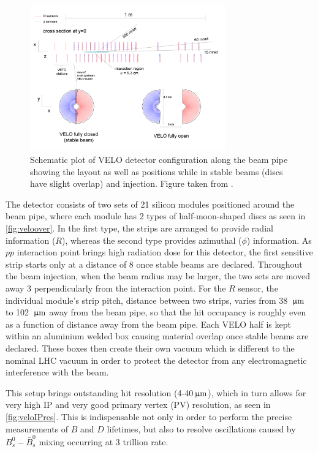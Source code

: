 \begin{figure}[!h]
	\centering
	\includegraphics[width = 0.75\textwidth]{figs/detector/veloOverview.png}
	\caption{ Schematic plot of \Gls{VELO} detector configuration along the beam pipe showing the layout as well as positions while in stable beams (discs have slight overlap) and injection. Figure taken from \cite{det_paper}.}
	\label{fig:veloover}
\end{figure}

The detector consists of two sets of 21 silicon modules positioned around the beam pipe, where each module has 2 types of half-moon-shaped discs as seen in \autoref{fig:veloover}. In the first type, the strips are arranged to provide radial information ($R$), whereas the second type provides azimuthal ($\phi$) information. As $pp$ interaction point brings high radiation dose for this detector, the first sensitive strip starts only at a distance of 8 \mm once stable beams are declared. Throughout the beam injection, when the beam radius may be larger, the two sets are moved away 3 \cm perpendicularly from the interaction point. For the $R$ sensor, the individual module's strip pitch, distance between two strips, varies from 38 ${\,\upmu\rm m}$ to 102 ${\,\upmu\rm m}$ away from the beam pipe, so that the hit occupancy is roughly even as a function of distance away from the beam pipe. Each \Gls{VELO} half is kept within an aluminium welded box causing material overlap once stable beams are declared. These boxes then create their own vacuum which is different to the nominal \gls{LHC} vacuum in order to protect the detector from any electromagnetic interference with the beam. 

This setup brings outstanding hit resolution (4-40${\,\upmu\rm m}$), which in turn allows for very high \gls{IP} and very good primary vertex (\gls{PV}) resolution, as seen in \autoref{fig:veloIPres}. This is indispensable not only in order to perform the precise measurements of $B$ and $D$ lifetimes, but also to resolve oscillations caused by $B^{0}_{s}-\bar{B}^{0}_{s}$ mixing occurring at 3 trillion \hz rate.

